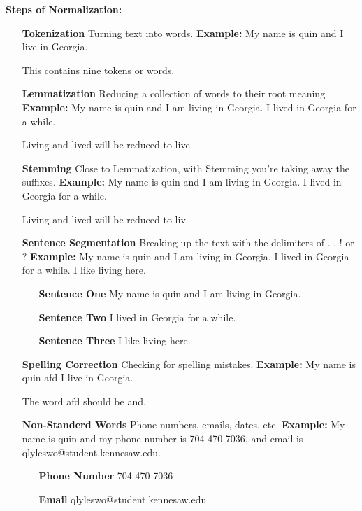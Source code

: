 
\textbf{Steps of Normalization:}
\begin{itemize}
	\item [\textbf{Tokenization}] Turning text into words.
	\subitem \textbf{Example:} My name is quin and I live in Georgia.

	This contains nine tokens or words.
	\item [\textbf{Lemmatization}] Reducing a collection of words to their root meaning
	\subitem \textbf{Example:} My name is quin and I am living in Georgia. I lived in Georgia for a while.

	Living and lived will be reduced to live.
	\item [\textbf{Stemming}] Close to Lemmatization, with Stemming you're taking away the suffixes.
	\subitem \textbf{Example:} My name is quin and I am living in Georgia. I lived in Georgia for a while.

	Living and lived will be reduced to liv.
	\item [\textbf{Sentence Segmentation}] Breaking up the text with the delimiters of . , ! or ?
	\subitem \textbf{Example:} My name is quin and I am living in Georgia. I lived in Georgia for a while. I like living here.
		\begin{itemize}
			\item [\textbf{Sentence One}] My name is quin and I am living in Georgia.
			\item [\textbf{Sentence Two}] I lived in Georgia for a while.
			\item [\textbf{Sentence Three}] I like living here.
		\end{itemize}
	\item [\textbf{Spelling Correction}] Checking for spelling mistakes.
	\subitem \textbf{Example:} My name is quin afd I live in Georgia.

	The word afd should be and.
	\item [\textbf{Non-Standerd Words}] Phone numbers, emails, dates, etc.
	\subitem \textbf{Example:} My name is quin and my phone number is  704-470-7036, and email is qlyleswo@student.kennesaw.edu.
		\begin{itemize}
			\item [\textbf{Phone Number}] 704-470-7036
			\item [\textbf{Email}] qlyleswo@student.kennesaw.edu
	\end{itemize}

\end{itemize}